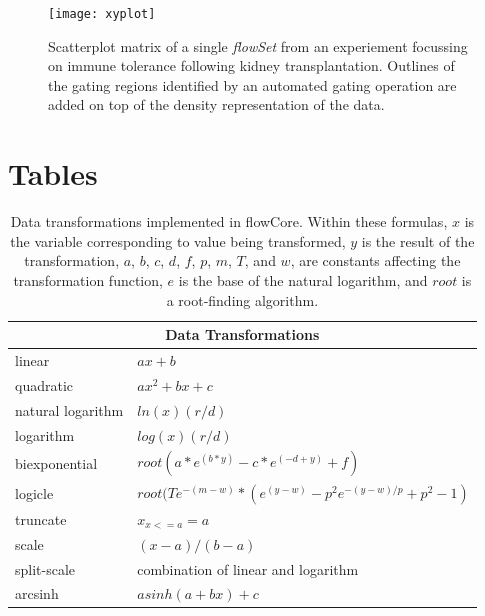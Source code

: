 \documentclass[12pt]{article}
\newcommand{\Rpackage}[1]{{\textsf{#1}}}
\newcommand{\Rclass}[1]{{\textit{#1}}}
\begin{document}
\begin{singlespace}
\begin{figure}[hp]
\centering
\texttt{[image: xyplot]}
\caption{\label{xyplot}%
  Scatterplot matrix of a single \Rclass{flowSet} from an experiement
  focussing on immune tolerance following kidney
  transplantation. Outlines of the gating regions identified by an
  automated gating operation are added on top of the density
  representation of the data.}
\end{figure}
\end{singlespace}

\clearpage
\section*{Tables}
\begin{table}[ht]
\begin{center}
\begin{tabular}{|l|l|}
\hline
\multicolumn{2}{|c|}{Data Transformations} \\
\hline
linear & $ax + b$ \\
quadratic & $ax^2 + bx + c$ \\
natural logarithm & $ln(x)(r/d)$ \\
logarithm & $log(x)(r/d)$ \\
biexponential & $root(a*e^{(b*y)}-c*e^{(-d+y)}+f)$ \\
logicle& $root(Te^{-(m-w)}*(e^{(y-w)}-p^2e^{-(y-w)/p}+p^2-1)$ \\
truncate & $x_{x<=a} = a$ \\
scale & $(x-a)/(b-a)$ \\
split-scale & combination of linear and logarithm \\
arcsinh & $asinh(a + bx)+c$ \\
\hline
\end{tabular}
\caption{\label{table1}Data transformations implemented in
  \Rpackage{flowCore}. Within these formulas, $x$ is the variable
  corresponding to value being transformed, $y$ is the result of the
  transformation, $a$, $b$, $c$, $d$, $f$, $p$, $m$, $T$, and $w$, are
  constants affecting the transformation function, $e$ is the base of
  the natural logarithm, and $root$ is a root-finding algorithm.  }
\end{center}
\end{table}
\end{document}
